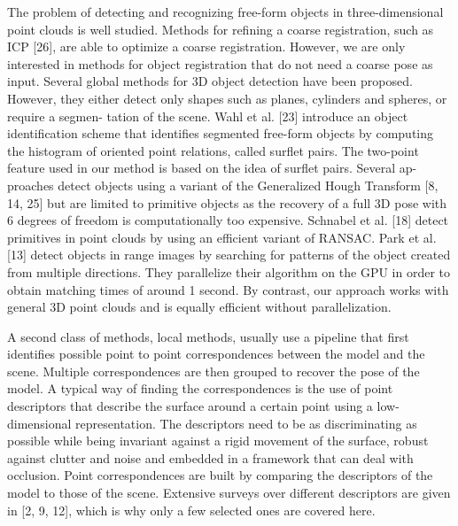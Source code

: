 \documentclass[10]{article}
\begin{document}
The problem of detecting and recognizing free-form objects in three-dimensional point clouds is well studied. Methods for refining a coarse registration, such as ICP [26], are able to optimize a coarse registration. However, we are only interested in methods for object registration that do not
need a coarse pose as input. Several global methods for 3D object detection have been proposed. However, they either detect only shapes such as planes, cylinders and spheres, or require a segmen-
tation of the scene. Wahl et al. [23] introduce an object identification scheme that identifies segmented free-form objects by computing the histogram of oriented point relations, called surflet pairs. The two-point feature used in our method is based on the idea of surflet pairs. Several ap-
proaches detect objects using a variant of the Generalized Hough Transform [8, 14, 25] but are limited to primitive objects as the recovery of a full 3D pose with 6 degrees of freedom is computationally too expensive. Schnabel et al. [18] detect primitives in point clouds by using an efficient variant of RANSAC. Park et al. [13] detect objects in range images by searching for patterns of the object created from multiple directions. They parallelize their algorithm on the GPU in order to obtain matching times of around 1 second. By contrast, our approach works with general 3D point clouds and is equally efficient without parallelization. 

A second class of methods, local methods, usually use a pipeline that first identifies possible point to point correspondences between the model and the scene. Multiple correspondences are then grouped to recover the pose of the model. A typical way of finding the correspondences is the use of point descriptors that describe the surface around a certain point using a low-dimensional representation. The descriptors need to be as discriminating as possible while being invariant against a rigid movement of the surface, robust against clutter and noise and embedded in a framework that can deal with occlusion. Point correspondences are built by comparing the descriptors of the model to those of the scene. Extensive surveys over different descriptors are given in [2, 9, 12], which is why only a few selected ones are covered here.
\end{document}

